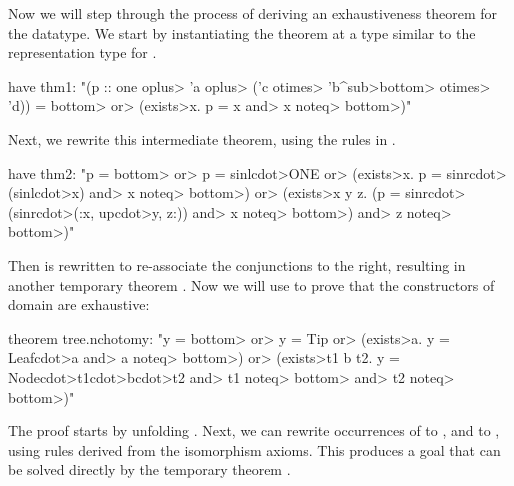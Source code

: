 Now we will step through the process of deriving an exhaustiveness theorem for the  datatype. We start by instantiating the theorem  at a type similar to the representation type for .
%
\begin{isacode}
have thm1: "(p :: one \<oplus> 'a \<oplus> ('c \<otimes> 'b\<^sub>\<bottom> \<otimes> 'd)) = \<bottom> \<or> (\<exists>x. p = x \<and> x \<noteq> \<bottom>)"
\end{isacode}
%
Next, we rewrite this intermediate theorem, using the rules in .
%
\begin{isacode}
have thm2: "p = \<bottom> \<or> p = sinl\<cdot>ONE \<or> (\<exists>x. p = sinr\<cdot>(sinl\<cdot>x) \<and> x \<noteq> \<bottom>) \<or>
  (\<exists>x y z. (p = sinr\<cdot>(sinr\<cdot>(:x, up\<cdot>y, z:)) \<and> x \<noteq> \<bottom>) \<and> z \<noteq> \<bottom>)"
\end{isacode}
%
Then  is rewritten to re-associate the conjunctions to the right, resulting in another temporary theorem . Now we will use  to prove that the constructors of domain  are exhaustive:
%
\begin{isacode}
theorem tree.nchotomy:
  "y = \<bottom> \<or> y = Tip \<or> (\<exists>a. y = Leaf\<cdot>a \<and> a \<noteq> \<bottom>) \<or>
    (\<exists>t1 b t2. y = Node\<cdot>t1\<cdot>b\<cdot>t2 \<and> t1 \<noteq> \<bottom> \<and> t2 \<noteq> \<bottom>)"
\end{isacode}
%
The proof starts by unfolding . Next, we can rewrite occurrences of  to , and  to , using rules derived from the isomorphism axioms. This produces a goal that can be solved directly by the temporary theorem .

